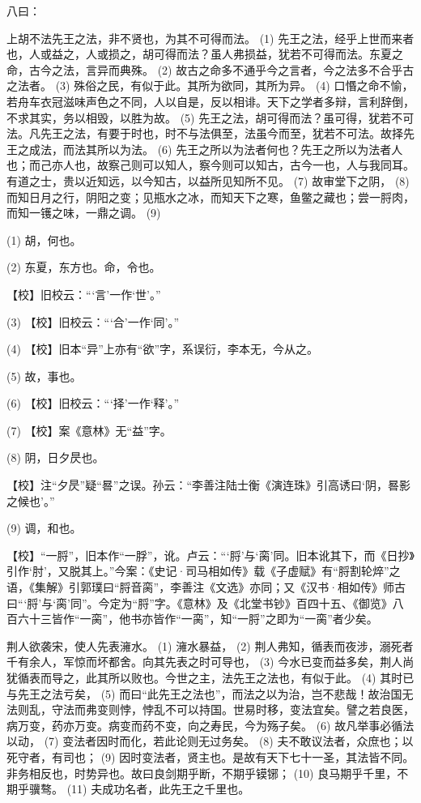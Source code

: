 \documentclass[12pt,UTF8]{ctexbook}
\begin{document}
八曰：

上胡不法先王之法，非不贤也，为其不可得而法。 (1) 先王之法，经乎上世而来者也，人或益之，人或损之，胡可得而法？虽人弗损益，犹若不可得而法。东夏之命，古今之法，言异而典殊。 (2) 故古之命多不通乎今之言者，今之法多不合乎古之法者。 (3) 殊俗之民，有似于此。其所为欲同，其所为异。 (4) 口惽之命不愉，若舟车衣冠滋味声色之不同，人以自是，反以相诽。天下之学者多辩，言利辞倒，不求其实，务以相毁，以胜为故。 (5) 先王之法，胡可得而法？虽可得，犹若不可法。凡先王之法，有要于时也，时不与法俱至，法虽今而至，犹若不可法。故择先王之成法，而法其所以为法。 (6) 先王之所以为法者何也？先王之所以为法者人也；而己亦人也，故察己则可以知人，察今则可以知古，古今一也，人与我同耳。有道之士，贵以近知远，以今知古，以益所见知所不见。 (7) 故审堂下之阴， (8) 而知日月之行，阴阳之变；见瓶水之冰，而知天下之寒，鱼鳖之藏也；尝一脟肉，而知一镬之味，一鼎之调。 (9)

(1) 胡，何也。

(2) 东夏，东方也。命，令也。

【校】旧校云：“‘言’一作‘世’。”

(3) 【校】旧校云：“‘合’一作‘同’。”

(4) 【校】旧本“异”上亦有“欲”字，系误衍，李本无，今从之。

(5) 故，事也。

(6) 【校】旧校云：“‘择’一作‘释’。”

(7) 【校】案《意林》无“益”字。

(8) 阴，日夕昃也。

【校】注“夕昃”疑“晷”之误。孙云：“李善注陆士衡《演连珠》引高诱曰‘阴，晷影之候也’。”

(9) 调，和也。

【校】“一脟”，旧本作“一脬”，讹。卢云：“‘脟’与‘脔’同。旧本讹其下，而《日抄》引作‘肘’，又脱其上。”今案：《史记·司马相如传》载《子虚赋》有“脟割轮焠”之语，《集解》引郭璞曰“脟音脔”，李善注《文选》亦同；又《汉书·相如传》师古曰“‘脟’与‘脔’同”。今定为“脟”字。《意林》及《北堂书钞》百四十五、《御览》八百六十三皆作“一脔”，他书亦皆作“一脔”，知“一脟”之即为“一脔”者少矣。

荆人欲袭宋，使人先表澭水。 (1) 澭水暴益， (2) 荆人弗知，循表而夜涉，溺死者千有余人，军惊而坏都舍。向其先表之时可导也， (3) 今水已变而益多矣，荆人尚犹循表而导之，此其所以败也。今世之主，法先王之法也，有似于此。 (4) 其时已与先王之法亏矣， (5) 而曰“此先王之法也”，而法之以为治，岂不悲哉！故治国无法则乱，守法而弗变则悖，悖乱不可以持国。世易时移，变法宜矣。譬之若良医，病万变，药亦万变。病变而药不变，向之寿民，今为殇子矣。 (6) 故凡举事必循法以动， (7) 变法者因时而化，若此论则无过务矣。 (8) 夫不敢议法者，众庶也；以死守者，有司也； (9) 因时变法者，贤主也。是故有天下七十一圣，其法皆不同。非务相反也，时势异也。故曰良剑期乎断，不期乎镆铘； (10) 良马期乎千里，不期乎骥骜。 (11) 夫成功名者，此先王之千里也。
\end{document}
